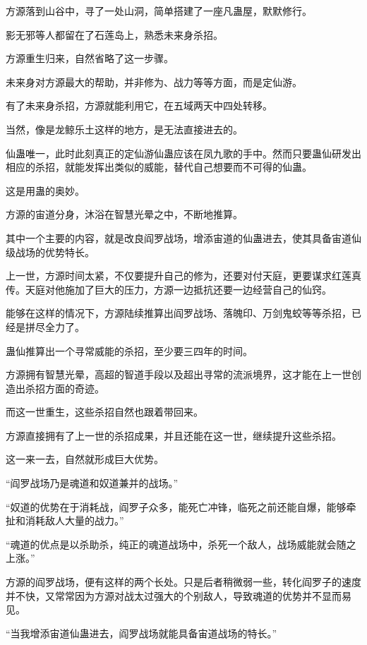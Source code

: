 
\begin{this_body}

方源落到山谷中，寻了一处山洞，简单搭建了一座凡蛊屋，默默修行。

影无邪等人都留在了石莲岛上，熟悉未来身杀招。

方源重生归来，自然省略了这一步骤。

未来身对方源最大的帮助，并非修为、战力等等方面，而是定仙游。

有了未来身杀招，方源就能利用它，在五域两天中四处转移。

当然，像是龙鲸乐土这样的地方，是无法直接进去的。

仙蛊唯一，此时此刻真正的定仙游仙蛊应该在凤九歌的手中。然而只要蛊仙研发出相应的杀招，就能发挥出类似的威能，替代自己想要而不可得的仙蛊。

这是用蛊的奥妙。

方源的宙道分身，沐浴在智慧光晕之中，不断地推算。

其中一个主要的内容，就是改良阎罗战场，增添宙道的仙蛊进去，使其具备宙道仙级战场的优势特长。

上一世，方源时间太紧，不仅要提升自己的修为，还要对付天庭，更要谋求红莲真传。天庭对他施加了巨大的压力，方源一边抵抗还要一边经营自己的仙窍。

能够在这样的情况下，方源陆续推算出阎罗战场、落魄印、万剑鬼蛟等等杀招，已经是拼尽全力了。

蛊仙推算出一个寻常威能的杀招，至少要三四年的时间。

方源拥有智慧光晕，高超的智道手段以及超出寻常的流派境界，这才能在上一世创造出杀招方面的奇迹。

而这一世重生，这些杀招自然也跟着带回来。

方源直接拥有了上一世的杀招成果，并且还能在这一世，继续提升这些杀招。

这一来一去，自然就形成巨大优势。

“阎罗战场乃是魂道和奴道兼并的战场。”

“奴道的优势在于消耗战，阎罗子众多，能死亡冲锋，临死之前还能自爆，能够牵扯和消耗敌人大量的战力。”

“魂道的优点是以杀助杀，纯正的魂道战场中，杀死一个敌人，战场威能就会随之上涨。”

方源的阎罗战场，便有这样的两个长处。只是后者稍微弱一些，转化阎罗子的速度并不快，又常常因为方源对战太过强大的个别敌人，导致魂道的优势并不显而易见。

“当我增添宙道仙蛊进去，阎罗战场就能具备宙道战场的特长。”


\end{this_body}

